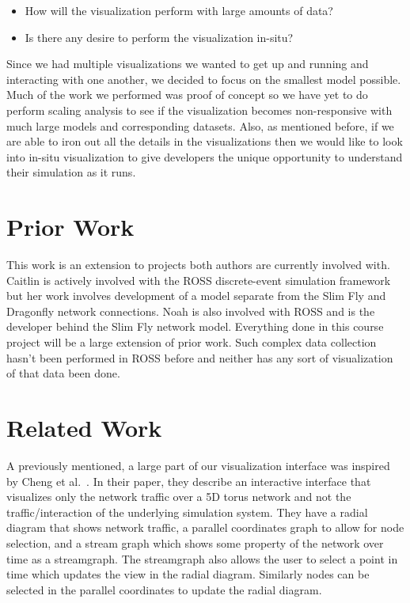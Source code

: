 \documentclass{acm_proc_article-sp}
\begin{document}
\begin{itemize}
\item How will the visualization perform with large amounts of data?
\item Is there any desire to perform the visualization in-situ?
\end{itemize}

Since we had multiple visualizations we wanted to get up and running and interacting with one another, we decided to focus on the smallest model possible. Much of the work we performed was proof of concept so we have yet to do perform scaling analysis to see if the visualization becomes non-responsive with much large models and corresponding datasets. Also, as mentioned before, if we are able to iron out all the details in the visualizations then we would like to look into in-situ visualization to give developers the unique opportunity to understand their simulation as it runs. 

\section{Prior Work}
This work is an extension to projects both authors are currently involved with. Caitlin is actively involved with the ROSS discrete-event simulation framework but her work involves development of a model separate from the Slim Fly and Dragonfly network connections. Noah is also involved with ROSS and is the developer behind the Slim Fly network model. Everything done in this course project will be a large extension of prior work. Such complex data collection hasn't been performed in ROSS before and neither has any sort of visualization of that data been done. 

\section{Related Work}
A previously mentioned, a large part of our visualization interface was inspired by Cheng et al.~\cite{cheng}.  In their paper, they describe an interactive interface that visualizes only the network traffic over a 5D torus network and not the traffic/interaction of the underlying simulation system.  They have a radial diagram that shows network traffic, a parallel coordinates graph to allow for node selection, and a stream graph which shows some property of the network over time as a streamgraph.  The streamgraph also allows the user to select a point in time which updates the view in the radial diagram.  Similarly nodes can be selected in the parallel coordinates to update the radial diagram.
\end{document}
